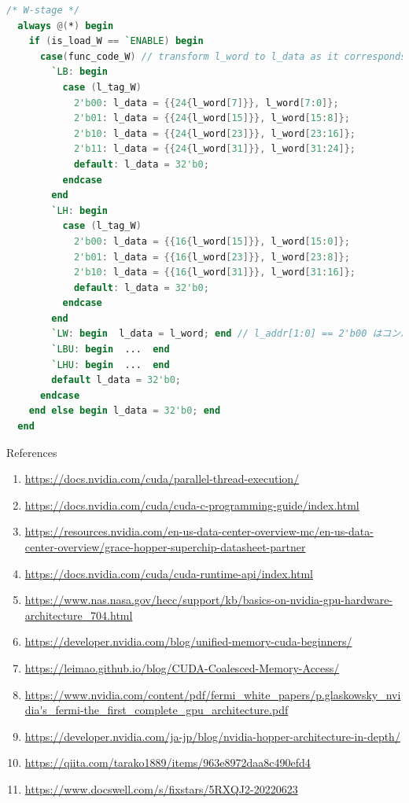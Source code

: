 \documentclass[dvipdfmx, 11pt, aspectratio=169]{beamer}   %
\begin{document}
\begin{frame}[fragile]%
    \begin{lstlisting}[language=verilog, basicstyle=\ttfamily\tiny]
  /* W-stage */
  always @(*) begin
    if (is_load_W == `ENABLE) begin
      case(func_code_W) // transform l_word to l_data as it corresponds to func_code
        `LB: begin
          case (l_tag_W)
            2'b00: l_data = {{24{l_word[7]}}, l_word[7:0]};
            2'b01: l_data = {{24{l_word[15]}}, l_word[15:8]};
            2'b10: l_data = {{24{l_word[23]}}, l_word[23:16]};
            2'b11: l_data = {{24{l_word[31]}}, l_word[31:24]};
            default: l_data = 32'b0;
          endcase
        end
        `LH: begin
          case (l_tag_W)
            2'b00: l_data = {{16{l_word[15]}}, l_word[15:0]};
            2'b01: l_data = {{16{l_word[23]}}, l_word[23:8]};
            2'b10: l_data = {{16{l_word[31]}}, l_word[31:16]};
            default: l_data = 32'b0;
          endcase
        end
        `LW: begin  l_data = l_word; end // l_addr[1:0] == 2'b00 はコンパイラが保証
        `LBU: begin  ...  end
        `LHU: begin  ...  end
        default l_data = 32'b0;
      endcase
    end else begin l_data = 32'b0; end
  end
\end{lstlisting}
\end{frame}
\begin{frame}[fragile]{References}
  \begin{enumerate}\footnotesize
    \item \url{https://docs.nvidia.com/cuda/parallel-thread-execution/}
    \item \url{https://docs.nvidia.com/cuda/cuda-c-programming-guide/index.html}
    \item \url{https://resources.nvidia.com/en-us-data-center-overview-mc/en-us-data-center-overview/grace-hopper-superchip-datasheet-partner}
    \item \url{https://docs.nvidia.com/cuda/cuda-runtime-api/index.html}
    \item \url{https://www.nas.nasa.gov/hecc/support/kb/basics-on-nvidia-gpu-hardware-architecture_704.html}
    \item \url{https://developer.nvidia.com/blog/unified-memory-cuda-beginners/}
    \item \url{https://leimao.github.io/blog/CUDA-Coalesced-Memory-Access/}
    \item \url{https://www.nvidia.com/content/pdf/fermi_white_papers/p.glaskowsky_nvidia's_fermi-the_first_complete_gpu_architecture.pdf}
    \item \url{https://developer.nvidia.com/ja-jp/blog/nvidia-hopper-architecture-in-depth/}
    \item \url{https://qiita.com/tarako1889/items/963e8972daa8c490efd4}
    \item \url{https://www.docswell.com/s/fixstars/5RXQJ2-20220623}
  \end{enumerate}
\end{frame}
\end{document}

